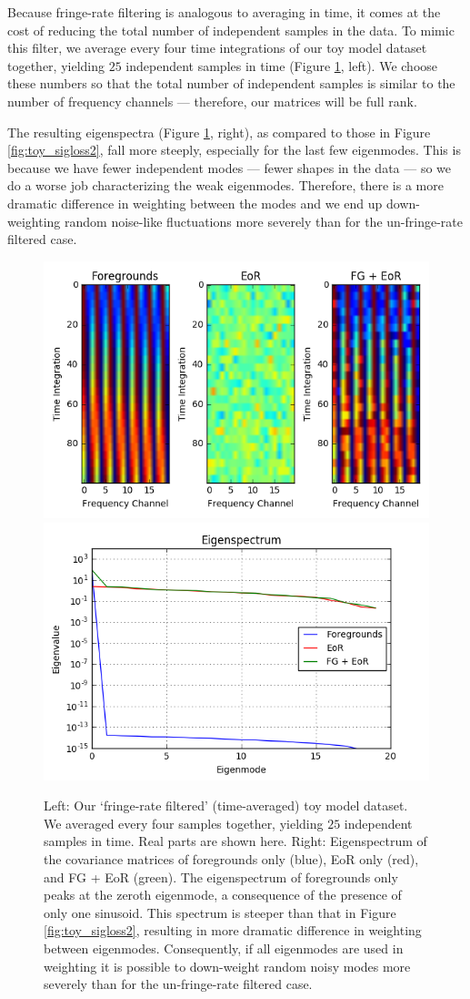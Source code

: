 \documentclass[preprint2,numberedappendix,tighten]{aastex6}  %
\begin{document}
Because fringe-rate filtering is analogous to averaging in time, it comes at the cost of reducing the total number of independent samples in the data. To mimic this filter, we average every four time integrations of our toy model dataset together, yielding $25$ independent samples in time (Figure \ref{fig:toy_sigloss5}, left). We choose these numbers so that the total number of independent samples is similar to the number of frequency channels --- therefore, our matrices will be full rank. 

The resulting eigenspectra (Figure \ref{fig:toy_sigloss5}, right), as compared to those in Figure \ref{fig:toy_sigloss2}, fall more steeply, especially for the last few eigenmodes. This is because we have fewer independent modes --- fewer shapes in the data --- so we do a worse job characterizing the weak eigenmodes. Therefore, there is a more dramatic difference in weighting between the modes and we end up down-weighting random noise-like fluctuations more severely than for the un-fringe-rate filtered case. 

\begin{figure}
	\centering
	\includegraphics[trim={0.3cm 0.2cm 0.3cm 0.3cm},clip,height=0.3\textwidth]{plots/toy_sigloss5.png}
	\includegraphics[trim={0.3cm 0.2cm 0.3cm 0.3cm},clip,height=0.3\textwidth]{plots/toy_sigloss6.png}
	\caption{Left: Our `fringe-rate filtered' (time-averaged) toy model dataset. We averaged every four samples together, yielding $25$ independent samples in time. Real parts are shown here. Right: Eigenspectrum of the covariance matrices of foregrounds only (blue), EoR only (red), and FG + EoR (green). The eigenspectrum of foregrounds only peaks at the zeroth eigenmode, a consequence of the presence of only one sinusoid. This spectrum is steeper than that in Figure \ref{fig:toy_sigloss2}, resulting in more dramatic difference in weighting between eigenmodes. Consequently, if all eigenmodes are used in weighting it is possible to down-weight random noisy modes more severely than for the un-fringe-rate filtered case.}
	\label{fig:toy_sigloss5}
\end{figure}
\end{document}
